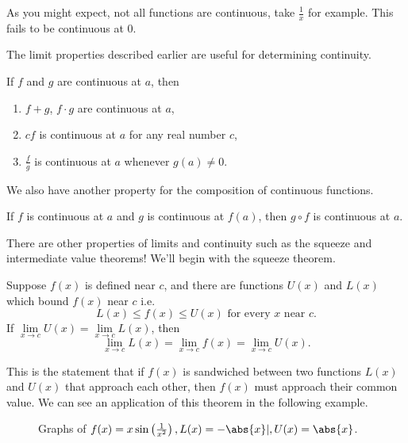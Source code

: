 As you might expect, not all functions are continuous, take $\frac{1}{x}$ for example. This fails to be continuous at $0$.

The limit properties described earlier are useful for determining continuity.
\begin{thm}
	If $f$ and $g$ are continuous at $a$, then
	\begin{enumerate}
		\item $f+g$, $f\cdot g$ are continuous at $a$,
		\item $cf$ is continuous at $a$ for any real number $c$,
		\item $\frac{f}{g}$ is continuous at $a$ whenever $g(a)\neq 0$.
	\end{enumerate}
\end{thm}

We also have another property for the composition of continuous functions.

\begin{thm}
	If $f$ is continuous at $a$ and $g$ is continuous at $f(a)$, then $g\circ f$ is continuous at $a$.
\end{thm}


There are other properties of limits and continuity such as the squeeze and intermediate value theorems! We'll begin with the squeeze theorem.

\begin{thm}
  Suppose $f(x)$ is defined near $c$, and there are functions $U(x)$ and $L(x)$ which bound $f(x)$ near $c$ i.e.
  \[
L(x)\leq f(x)\leq U(x)\text{ for every }x\text{ near }c.
  \]
  If $\lim\limits_{x\to c} U(x)= \lim\limits_{x\to c} L(x)$, then
  \[
  \lim\limits_{x\to c} L(x)=\lim\limits_{x\to c} f(x) =\lim\limits_{x\to c} U(x).
  \]
\end{thm}

  This is the statement that if $f(x)$ is sandwiched between two functions $L(x)$ and $U(x)$ that approach each other, then $f(x)$ must approach their common value. We can see an application of this theorem in the following example.

  \begin{figure}[h]
    \centering
    \label{fig:Squeeze}
    \caption{Graphs of $f(x)=x\sin\left(\frac{1}{x^2}\right), L(x)=-\abs{x}|, U(x)=\abs{x}$.}
  \end{figure}


